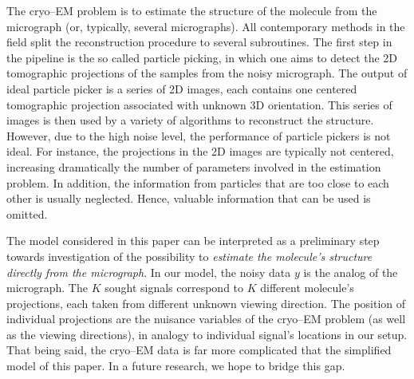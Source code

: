 \documentclass[english,11pt]{article}
\numberwithin{equation}{section}
\theoremstyle{plain}
\theoremstyle{definition}
\theoremstyle{remark}
\theoremstyle{plain}
\theoremstyle{remark}
\theoremstyle{plain}
\theoremstyle{plain}
\begin{document}
The cryo--EM problem is to estimate the structure of the molecule from the micrograph (or, typically, several micrographs). 
All contemporary methods in the field split the reconstruction procedure to several subroutines. 
The first step in the pipeline is the so called particle picking, in which one aims to detect the 2D tomographic projections of the samples from the noisy micrograph. The output of ideal particle picker is a series of 2D images, each contains one centered tomographic projection associated with unknown 3D orientation. This series of images 
 is then used by a variety of algorithms to reconstruct the structure. 
However, due to the high noise level, the performance of particle pickers  is not ideal. For instance, the projections in the 2D images are typically not centered, increasing dramatically the number of parameters involved in the estimation problem. In addition, the information from particles that are too close to each other is usually neglected. Hence, valuable information that can be used is omitted. 

The model considered in this paper can be interpreted as a preliminary step towards investigation of the possibility to \emph{estimate the molecule's structure directly from the micrograph}. 
In our model, the noisy data $y$ is the analog of the micrograph. The $K$ sought signals correspond to $K$ different molecule's projections, each taken from  different unknown viewing direction. %
The position of individual projections are the nuisance variables of the cryo--EM problem (as well as the viewing directions), in analogy to individual signal's locations in our setup.
That being said, the cryo--EM data is far more complicated that the simplified model of this paper. In a future research, we hope to bridge this gap.
 
%



\end{document}
